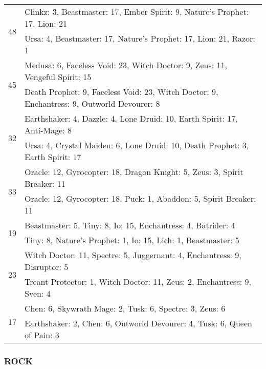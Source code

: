 \begin{table}[H]
\begin{tabular}{ | c | p{12.5cm} | }
\hline
\multirow{2}{*}{48}
& Clinkz: 3, Beastmaster: 17, Ember Spirit: 9, Nature's Prophet: 17, Lion: 21 \\
& Ursa: 4, Beastmaster: 17, Nature's Prophet: 17, Lion: 21, Razor: 1 \\
\hline
\multirow{2}{*}{45}
& Medusa: 6, Faceless Void: 23, Witch Doctor: 9, Zeus: 11, Vengeful Spirit: 15 \\
& Death Prophet: 9, Faceless Void: 23, Witch Doctor: 9, Enchantress: 9, Outworld Devourer: 8 \\
\hline
\multirow{2}{*}{32}
& Earthshaker: 4, Dazzle: 4, Lone Druid: 10, Earth Spirit: 17, Anti-Mage: 8 \\
& Ursa: 4, Crystal Maiden: 6, Lone Druid: 10, Death Prophet: 3, Earth Spirit: 17 \\
\hline
\multirow{2}{*}{33}
& Oracle: 12, Gyrocopter: 18, Dragon Knight: 5, Zeus: 3, Spirit Breaker: 11 \\
& Oracle: 12, Gyrocopter: 18, Puck: 1, Abaddon: 5, Spirit Breaker: 11 \\
\hline
\multirow{2}{*}{19}
& Beastmaster: 5, Tiny: 8, Io: 15, Enchantress: 4, Batrider: 4 \\
& Tiny: 8, Nature's Prophet: 1, Io: 15, Lich: 1, Beastmaster: 5 \\
\hline
\multirow{2}{*}{23}
& Witch Doctor: 11, Spectre: 5, Juggernaut: 4, Enchantress: 9, Disruptor: 5 \\
& Treant Protector: 1, Witch Doctor: 11, Zeus: 2, Enchantress: 9, Sven: 4 \\
\hline
\multirow{2}{*}{17}
& Chen: 6, Skywrath Mage: 2, Tusk: 6, Spectre: 3, Zeus: 6 \\
& Earthshaker: 2, Chen: 6, Outworld Devourer: 4, Tusk: 6, Queen of Pain: 3 \\
\hline
    \end{tabular}
    \caption{}
    \label{}
    \end{table}

\subsubsection*{ROCK}


